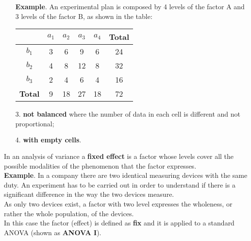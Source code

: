 \begin{frame}
  \begin{itemize}
  \item[]  \textbf{Example}. An experimental plan is composed by 4 levels of the factor A and 3 levels of the factor B, as shown in the table:
    \begin{center}
      \begin{tabular}{|c|c|c|c|c|c|}
        \hline
        & $a_1$ &   $a_2$ &  $a_3$ &  $a_4$ & \textbf{Total}\\ \hline
        $b_1$ & 3 & 6 & 9 & 6 & 24\\ \hline
        $b_2$ & 4 & 8 & 12 & 8 & 32\\ \hline
        $b_3$ & 2 & 4 & 6 & 4 & 16\\ \hline
        \textbf{Total} & 9 & 18 & 27 & 18 & 72\\ \hline
      \end{tabular}
    \end{center}
    \vspace{.5cm}
    \item[3.] \textbf{not balanced} where the number of data in each cell is different and not proportional;
    \vspace{.15cm}
    \item[4.] \textbf{with empty cells}.
  \end{itemize}
\end{frame}


\begin{frame}
\vspace*{.25cm} 
In an analysis of variance a \textbf{fixed effect} is a factor whose levels cover all the possible modalities of the phenomenon that the factor expresses.\\
\vspace*{.5cm} 
\textbf{Example}. In a company there are two identical measuring devices with the same duty. An experiment has to be carried out in order to understand if there is a significant difference in the way the two devices measure.\\
\vspace*{.5cm} 
As only two devices exist, a factor with two level expresses the wholeness, or rather the whole population, of the devices.\\
\vspace*{.5cm} 
In this case the factor (effect) is defined as \textbf{fix} and it is applied to a standard ANOVA (shown as \textbf{ANOVA I}).
\end{frame}


